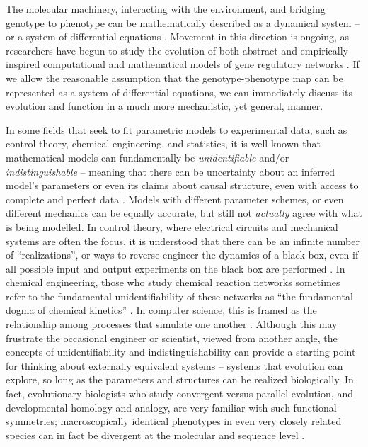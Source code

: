 \documentclass{article}
\newcommand{\plr}[1]{\todo[color=blue!25]{#1}}
\newcommand{\js}[1]{\todo[color=green!25]{#1}}
\newcommand{\plr}[1]{{\color{blue}\it #1}}
\newcommand{\1}{\mathbbm{1}}
\begin{document}
The molecular machinery, interacting with the environment, and bridging genotype to phenotype
can be mathematically described as a dynamical system -- or a system of differential equations \citep{jaeger2015comet}.
 Movement in this direction is ongoing, as researchers have begun to study 
the evolution of both abstract \citep{wagner1994evolution, wagner1996does,  siegal2002waddington, bergman2003evolutionary, draghi2015robustness} and empirically inspired computational and mathematical models of gene regulatory networks \citep{mjolsness1991connectionist, jaeger2004dynamic, maria1, vitaly1, vitaly2, crombach2016gap, wotton2015quantitative, chertkova2017insilico}. If we allow the reasonable assumption that the genotype-phenotype map can be represented as a system of differential equations, we can immediately discuss its evolution and function in a much more mechanistic, yet general, manner. 

In some fields that seek to fit parametric models to experimental data, such as control
theory, chemical engineering, and statistics, it is well known that mathematical models
can fundamentally be \emph{unidentifiable} and/or \emph{indistinguishable} -- meaning that 
there can be uncertainty about an inferred model's parameters or even its claims about
causal structure, even with access to complete and perfect data \citep{bellman1970structural, grewal1976identifiability, walter1984structural}. 
Models with different parameter schemes, or even different mechanics can be equally accurate, 
but still not \emph{actually} agree with what is being modelled. 
In control theory, where electrical circuits and mechanical systems are often the focus, 
it is understood that there can be an infinite number of ``realizations'', 
or ways to reverse engineer the dynamics of a black box,
even if all possible input and output experiments on the black box are performed \citep{kalman1963mathematical, anderson1966equivalence, zadeh1976linear}. 
In chemical engineering, those who study chemical reaction networks sometimes refer to the fundamental
unidentifiability of these networks as ``the fundamental dogma of chemical kinetics'' \citep{craciun2008identifiability}. 
In computer science, this is framed as the relationship among processes that simulate one another \citep{van2004equivalence}.  
Although this may frustrate the occasional engineer or scientist, viewed from another angle,
the concepts of unidentifiability and indistinguishability can provide a starting point for
thinking about externally equivalent systems
-- systems that evolution can explore, so long as the parameters and structures can be realized biologically.
In fact, evolutionary
biologists who study convergent versus parallel evolution, and developmental homology and analogy, are very familiar with such functional symmetries; 
macroscopically identical phenotypes in even very closely related species can in fact be divergent at the molecular and sequence level 
\citep{true2001developmental, tsong2006evolution, hare2008sepsid, vierstra2014mouse, stergachis2014conservation, taylor2016diverse, matsui2015regulatory}.
\end{document}
